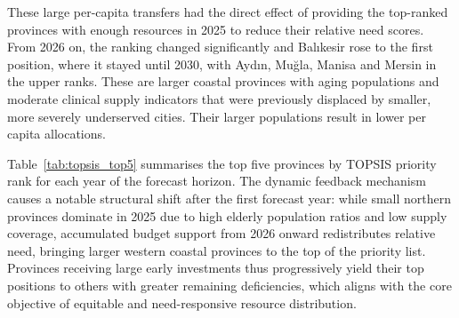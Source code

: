 \documentclass[final, 9pt, twocolumn]{saucis}
\begin{document}
These large per-capita transfers had the direct effect of providing the top-ranked provinces with enough resources in 2025 to reduce their relative need scores. From 2026 on, the ranking changed significantly and Balıkesir rose to the first position, where it stayed until 2030, with Aydın, Muğla, Manisa and Mersin in the upper ranks. These are larger coastal provinces with aging populations and moderate clinical supply indicators that were previously displaced by smaller, more severely underserved cities. Their larger populations result in lower per capita allocations.

Table~\ref{tab:topsis_top5} summarises the top five provinces by TOPSIS priority rank for each year of the forecast horizon. The dynamic feedback mechanism causes a notable structural shift after the first forecast year: while small northern provinces dominate in 2025 due to high elderly population ratios and low supply coverage, accumulated budget support from 2026 onward redistributes relative need, bringing larger western coastal provinces to the top of the priority list. Provinces receiving large early investments thus progressively yield their top positions to others with greater remaining deficiencies, which aligns with the core objective of equitable and need-responsive resource distribution.
\end{document}
